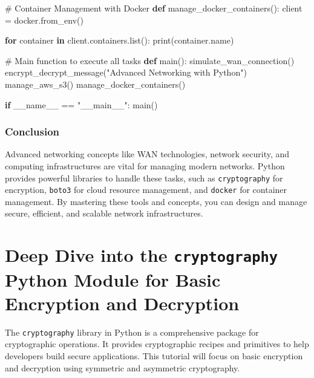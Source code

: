 \documentclass[
  letterpaper,
  DIV=11,
  numbers=noendperiod]{scrreprt}
\newenvironment{Shaded}{\begin{snugshade}}{\end{snugshade}}
\newcommand{\BuiltInTok}[1]{\textcolor[rgb]{0.00,0.23,0.31}{#1}}
\newcommand{\CommentTok}[1]{\textcolor[rgb]{0.37,0.37,0.37}{#1}}
\newcommand{\ControlFlowTok}[1]{\textcolor[rgb]{0.00,0.23,0.31}{\textbf{#1}}}
\newcommand{\KeywordTok}[1]{\textcolor[rgb]{0.00,0.23,0.31}{\textbf{#1}}}
\newcommand{\NormalTok}[1]{\textcolor[rgb]{0.00,0.23,0.31}{#1}}
\newcommand{\OperatorTok}[1]{\textcolor[rgb]{0.37,0.37,0.37}{#1}}
\newcommand{\StringTok}[1]{\textcolor[rgb]{0.13,0.47,0.30}{#1}}
\newcommand{\VariableTok}[1]{\textcolor[rgb]{0.07,0.07,0.07}{#1}}
\begin{document}
\begin{Shaded}
\begin{Highlighting}[]
\CommentTok{\# Container Management with Docker}
\KeywordTok{def}\NormalTok{ manage\_docker\_containers():}
\NormalTok{    client }\OperatorTok{=}\NormalTok{ docker.from\_env()}
    
    \ControlFlowTok{for}\NormalTok{ container }\KeywordTok{in}\NormalTok{ client.containers.}\BuiltInTok{list}\NormalTok{():}
        \BuiltInTok{print}\NormalTok{(container.name)}

\CommentTok{\# Main function to execute all tasks}
\KeywordTok{def}\NormalTok{ main():}
\NormalTok{    simulate\_wan\_connection()}
\NormalTok{    encrypt\_decrypt\_message(}\StringTok{"Advanced Networking with Python"}\NormalTok{)}
\NormalTok{    manage\_aws\_s3()}
\NormalTok{    manage\_docker\_containers()}

\ControlFlowTok{if} \VariableTok{\_\_name\_\_} \OperatorTok{==} \StringTok{"\_\_main\_\_"}\NormalTok{:}
\NormalTok{    main()}
\end{Highlighting}
\end{Shaded}

\subsection{Conclusion}\label{conclusion-37}

Advanced networking concepts like WAN technologies, network security,
and computing infrastructures are vital for managing modern networks.
Python provides powerful libraries to handle these tasks, such as
\texttt{cryptography} for encryption, \texttt{boto3} for cloud resource
management, and \texttt{docker} for container management. By mastering
these tools and concepts, you can design and manage secure, efficient,
and scalable network infrastructures.


\chapter{\texorpdfstring{Deep Dive into the \texttt{cryptography} Python
Module for Basic Encryption and
Decryption}{Deep Dive into the cryptography Python Module for Basic Encryption and Decryption}}\label{deep-dive-into-the-cryptography-python-module-for-basic-encryption-and-decryption}

The \texttt{cryptography} library in Python is a comprehensive package
for cryptographic operations. It provides cryptographic recipes and
primitives to help developers build secure applications. This tutorial
will focus on basic encryption and decryption using symmetric and
asymmetric cryptography.
\end{document}
